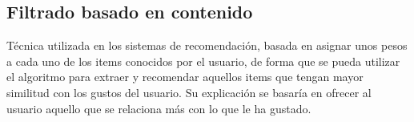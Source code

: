 \subsection{Filtrado basado en contenido}
Técnica utilizada en los sistemas de recomendación,  basada en asignar unos pesos a cada uno de los items conocidos por el usuario, de forma que se pueda utilizar el algoritmo para extraer y recomendar aquellos items que tengan mayor similitud con los gustos del usuario.
Su explicación se basaría en ofrecer al usuario aquello que se relaciona más con lo que le ha gustado. 

 
